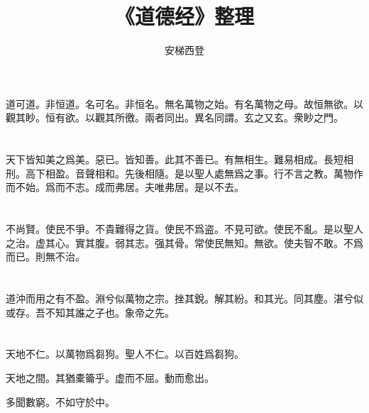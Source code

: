 \documentclass[a5paper]{ctexbook}
\title{《道德经》整理}
\author{安梯西登}
\date{}
\begin{document}
    \maketitle

    \tableofcontents

    \chapter{}

    道可道。非恒道。名可名。非恒名。無名萬物之始。有名萬物之母。故恒無欲。以觀其眇。恒有欲。以觀其所徼。兩者同出。異名同謂。玄之又玄。衆眇之門。

    \chapter{}

    天下皆知美之爲美。惡已。皆知善。此其不善已。有無相生。難易相成。長短相刑。高下相盈。音聲相和。先後相隨。是以聖人處無爲之事。行不言之教。萬物作而不始。爲而不志。成而弗居。夫唯弗居。是以不去。

    \chapter{}

    不尚賢。使民不爭。不貴難得之貨。使民不爲盗。不見可欲。使民不亂。是以聖人之治。虚其心。實其腹。弱其志。强其骨。常使民無知。無欲。使夫智不敢。不爲而已。則無不治。

    \chapter{}

    道沖而用之有不盈。淵兮似萬物之宗。挫其銳。解其紛。和其光。同其塵。湛兮似或存。吾不知其誰之子也。象帝之先。

    \chapter{}

    天地不仁。以萬物爲芻狗。聖人不仁。以百姓爲芻狗。
    
    天地之間。其猶橐籥乎。虚而不屈。動而愈出。
    
    多聞數窮。不如守於中。

    \chapter{}
\end{document}
